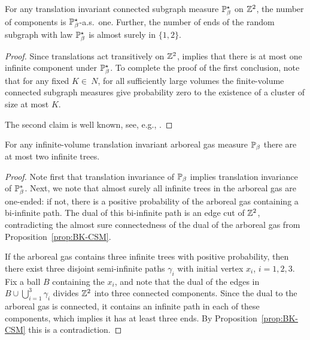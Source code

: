 \documentclass[11pt]{amsart}
\numberwithin{equation}{section}
\numberwithin{theorem}{section}
\begin{document}
\begin{proposition}
  \label{prop:BK-CSM}
  For any translation invariant connected subgraph measure
  $\P_{\beta}^{\star}$ on $\Z^{2}$, the number of components is
  $\P_{\beta}^{\star}$-a.s.\ one. Further, the number of ends of the
  random subgraph with law $\P_{\beta}^{\star}$ is almost surely in
  $\{1,2\}$.
\end{proposition}
\begin{proof}
  Since translations act transitively on $\Z^{2}$,
  \cite[Theorem~7.9]{MR3616205} implies that there is at most one
  infinite component under $\P_{\beta}^{\star}$. To complete the proof
  of the first conclusion, note that for any fixed $K\in\ N$, for all
  sufficiently large volumes the finite-volume connected subgraph
  measures give probability zero to the existence of a cluster of size
  at most $K$.

  The second claim is well known, see, e.g., \cite[Exercise~7.24]{MR3616205}.
\end{proof}

\begin{lemma}
  \label{lem:topo}
  For any infinite-volume translation invariant arboreal gas measure
  $\P_{\beta}$ there are at most two infinite trees.
\end{lemma}
\begin{proof}
  Note first that translation invariance of $\P_{\beta}$ implies translation invariance of $\P_{\beta}^*$.  Next, we note that almost surely all infinite trees in the arboreal
  gas are one-ended: if not, there is a positive probability of the
  arboreal gas containing a bi-infinite path. The dual of this
  bi-infinite path is an edge cut of $\Z^{2}$, contradicting the
  almost sure connectedness of the dual of the arboreal gas from
  Proposition~\ref{prop:BK-CSM}.

  If the arboreal gas contains three infinite trees with positive
  probability, then there exist three disjoint semi-infinite paths
  $\gamma_{i}$ with initial vertex $x_{i}$, $i=1,2,3$. Fix a ball $B$
  containing the $x_{i}$, and note that the dual of the edges in
  $B\cup \bigcup_{i=1}^{3}\gamma_{i}$ divides $\Z^{2}$ into three
  connected components. Since the dual to the arboreal gas is
  connected, it contains an infinite path in each of these components,
  which implies it has at least three ends.  By
  Proposition~\ref{prop:BK-CSM} this is a contradiction.
\end{proof}
\end{document}
